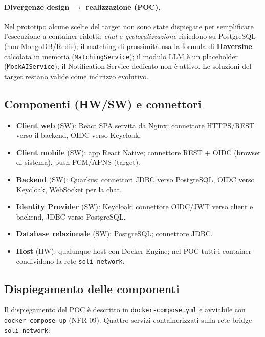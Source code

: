 \documentclass[11pt,a4paper]{article}
\begin{document}
\paragraph{Divergenze design $\to$ realizzazione (POC).} Nel prototipo alcune scelte del target non sono state dispiegate per semplificare l'esecuzione a container ridotti: \emph{chat} e \emph{geolocalizzazione} risiedono su PostgreSQL (non MongoDB/Redis); il matching di prossimit\`a usa la formula di \textbf{Haversine} calcolata in memoria (\texttt{MatchingService}); il modulo LLM \`e un placeholder (\texttt{MockAIService}); il Notification Service dedicato non \`e attivo. Le soluzioni del target restano valide come indirizzo evolutivo.

\subsection{Componenti (HW/SW) e connettori}
\begin{itemize}[leftmargin=1.4em]
  \item \textbf{Client web} (SW): React SPA servita da Nginx; connettore HTTPS/REST verso il backend, OIDC verso Keycloak.
  \item \textbf{Client mobile} (SW): app React Native; connettore REST + OIDC (browser di sistema), push FCM/APNS (target).
  \item \textbf{Backend} (SW): Quarkus; connettori JDBC verso PostgreSQL, OIDC verso Keycloak, WebSocket per la chat.
  \item \textbf{Identity Provider} (SW): Keycloak; connettore OIDC/JWT verso client e backend, JDBC verso PostgreSQL.
  \item \textbf{Database relazionale} (SW): PostgreSQL; connettore JDBC.
  \item \textbf{Host} (HW): qualunque host con Docker Engine; nel POC tutti i container condividono la rete \texttt{soli-network}.
\end{itemize}

\subsection{Dispiegamento delle componenti}
Il dispiegamento del POC \`e descritto in \texttt{docker-compose.yml} e avviabile con \texttt{docker compose up} (NFR-09). Quattro servizi containerizzati sulla rete bridge \texttt{soli-network}:
\end{document}
